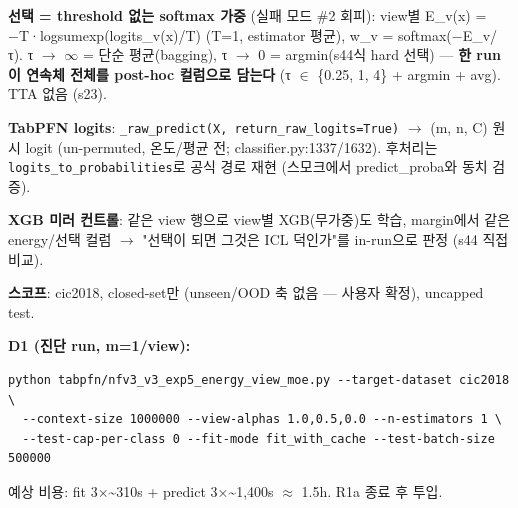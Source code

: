\par\noindent \textbullet\enspace \textbf{선택 =\allowbreak{} threshold 없는 softmax 가중} (실패 모드 \#2 회피): view별 E\_\allowbreak{}v(x) =\allowbreak{} −T·logsumexp(logits\_\allowbreak{}v(x)/\allowbreak{}T) (T=\allowbreak{}1, estimator 평균), w\_\allowbreak{}v =\allowbreak{} softmax(−E\_\allowbreak{}v/\allowbreak{}τ). τ \ensuremath{\rightarrow} \ensuremath{\infty} =\allowbreak{} 단순 평균(bagging), τ \ensuremath{\rightarrow} 0 =\allowbreak{} argmin(s44식 hard 선택) — \textbf{한 run이 연속체 전체를 post-hoc 컬럼으로 담는다} (τ \ensuremath{\in} \{0.25, 1, 4\} +\allowbreak{} argmin +\allowbreak{} avg). TTA 없음 (s23).


\par\noindent \textbullet\enspace \textbf{TabPFN logits}: \texttt{\_\allowbreak{}\allowbreak{}raw\_\allowbreak{}\allowbreak{}pre\allowbreak{}dict(X,\allowbreak{} \allowbreak{}return\_\allowbreak{}\allowbreak{}r\allowbreak{}aw\_\allowbreak{}\allowbreak{}logit\allowbreak{}s=\allowbreak{}\allowbreak{}True)}  \ensuremath{\rightarrow}  (m, n, C) 원시 logit (un-permuted, 온도/\allowbreak{}평균 전; classifier.py:1337/\allowbreak{}1632). 후처리는 \texttt{logits\_\allowbreak{}\allowbreak{}t\allowbreak{}o\_\allowbreak{}\allowbreak{}probab\allowbreak{}ilities}로 공식 경로 재현 (스모크에서 predict\_\allowbreak{}proba와 동치 검증).


\par\noindent \textbullet\enspace \textbf{XGB 미러 컨트롤}: 같은 view 행으로 view별 XGB(무가중)도 학습, margin에서 같은 energy/\allowbreak{}선택 컬럼  \ensuremath{\rightarrow}  "선택이 되면 그것은 ICL 덕인가"를 in-run으로 판정 (s44 직접 비교).


\par\noindent \textbullet\enspace \textbf{스코프}: cic2018, closed-set만 (unseen/\allowbreak{}OOD 축 없음 — 사용자 확정), uncapped test.


\textbf{D1 (진단 run, m=\allowbreak{}1/\allowbreak{}view):}


\begin{Verbatim}[breaklines=true,breakanywhere=true,fontsize=\scriptsize]
python tabpfn/nfv3_v3_exp5_energy_view_moe.py --target-dataset cic2018 \
  --context-size 1000000 --view-alphas 1.0,0.5,0.0 --n-estimators 1 \
  --test-cap-per-class 0 --fit-mode fit_with_cache --test-batch-size 500000

\end{Verbatim}
예상 비용: fit 3×\textasciitilde{}310s +\allowbreak{} predict 3×\textasciitilde{}1,400s \ensuremath{\approx} 1.5h. R1a 종료 후 투입.

